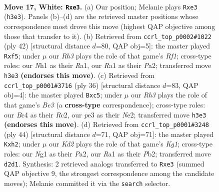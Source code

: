 \documentclass[11pt]{article}
\begin{document}
\clearpage

\begin{figure}[p]\centering
\begin{subfigure}{0.46\textwidth}\centering
\resizebox{\linewidth}{!}{%
\newchessgame
\chessboard[
  setfen={r3kbnr/2n3p1/6bp/p3p3/2B4P/4p2R/PP1K1PP1/R5NN w kq - 0 17},
  showmover=false,
  pgfstyle=straightmove, color=movearrow, markmove={h3-e3}
]}
\caption{}
\end{subfigure}\hfill
\begin{subfigure}{0.46\textwidth}\centering
\resizebox{\linewidth}{!}{%
\newchessgame
\chessboard[
  setfen={2kr1b1r/p6p/1pn2p2/2p2n2/2P5/2N1B2P/PP4PK/R4R2 w - - 0 22},
  showmover=false,
  pgfstyle=straightmove, color=movearrow, markmove={f1-f5}
]}
\caption{}
\end{subfigure}
\\[4pt]
\begin{subfigure}{0.46\textwidth}\centering
\resizebox{\linewidth}{!}{%
\newchessgame
\chessboard[
  setfen={r3kb1r/p4ppp/8/n1p1n3/1p2P3/4BP2/1PR1NNPP/4K2R w Kkq - 0 19},
  showmover=false,
  pgfstyle=straightmove, color=movearrow, markmove={e3-c5}
]}
\caption{}
\end{subfigure}\hfill
\begin{subfigure}{0.46\textwidth}\centering
\resizebox{\linewidth}{!}{%
\newchessgame
\chessboard[
  setfen={2kr1b1r/pp4pp/2n5/3pPR2/3P4/2N1BR2/PP5p/6K1 w - - 0 23},
  showmover=false,
  pgfstyle=straightmove, color=movearrow, markmove={g1-h2}
]}
\caption{}
\end{subfigure}
\caption{\textbf{Move 17, White: \texttt{Rxe3}.} (a) Our position; Melanie plays \texttt{Rxe3} (\texttt{h3e3}). Panels (b)--(d) are the retrieved master positions whose correspondence most drove this move (highest QAP objective among those that transfer to it). (b) Retrieved from \texttt{ccrl\_top\_p0002\#1022} (ply 42) [structural distance $d$=80, QAP obj=5]: the master played \texttt{Rxf5}; under $\mu$ our \emph{Rh3} plays the role of that game's \emph{Rf1}; cross-type roles: our \emph{N}h1 as their \emph{R}a1, our \emph{R}a1 as their \emph{P}a2; transferred move \texttt{h3e3} \textbf{(endorses this move)}. (c) Retrieved from \texttt{ccrl\_top\_p0001\#3716} (ply 36) [structural distance $d$=83, QAP obj=4]: the master played \texttt{Bxc5}; under $\mu$ our \emph{Rh3} plays the role of that game's \emph{Be3} (a \textbf{cross-type} correspondence); cross-type roles: our \emph{B}c4 as their \emph{R}c2, our \emph{p}e3 as their \emph{N}e2; transferred move \texttt{h3e3} \textbf{(endorses this move)}. (d) Retrieved from \texttt{ccrl\_top\_p0001\#3248} (ply 44) [structural distance $d$=71, QAP obj=71]: the master played \texttt{Kxh2}; under $\mu$ our \emph{Kd2} plays the role of that game's \emph{Kg1}; cross-type roles: our \emph{N}g1 as their \emph{P}a2, our \emph{R}a1 as their \emph{P}b2; transferred move \texttt{d2d1}. Synthesis: 2 retrieved analogs transferred to \texttt{Rxe3} (summed QAP objective 9, the strongest correspondence among the candidate moves); Melanie committed it via the \texttt{search} selector.}
\label{fig:thought-m32}
\end{figure}
\end{document}
